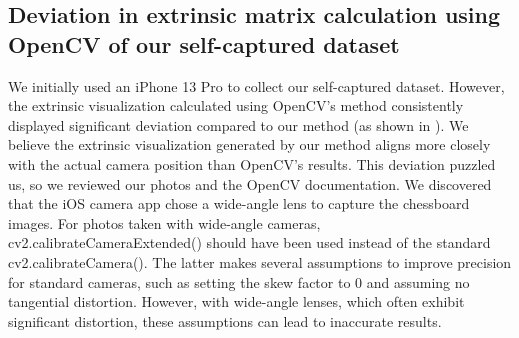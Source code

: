\documentclass[12pt,letterpaper]{article}
\begin{document}
\subsection{Deviation in extrinsic matrix calculation using OpenCV of our self-captured dataset}
We initially used an iPhone 13 Pro to collect our self-captured dataset. However, the extrinsic visualization calculated using OpenCV's method consistently displayed significant deviation compared to our method (as shown in ). We believe the extrinsic visualization generated by our method aligns more closely with the actual camera position than OpenCV's results. This deviation puzzled us, so we reviewed our photos and the OpenCV documentation. We discovered that the iOS camera app chose a wide-angle lens to capture the chessboard images. For photos taken with wide-angle cameras, cv2.calibrateCameraExtended() should have been used instead of the standard cv2.calibrateCamera(). The latter makes several assumptions to improve precision for standard cameras, such as setting the skew factor to 0 and assuming no tangential distortion. However, with wide-angle lenses, which often exhibit significant distortion, these assumptions can lead to inaccurate results.
\begin{table}[htbp]
    \centering
    \caption{Extrinsic visualization differences between OpenCV and our method}
    \label{table:ExtDifferences}
\end{table}
\end{document}
